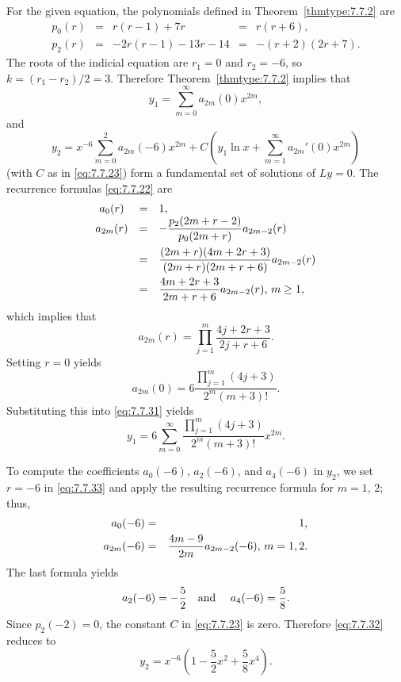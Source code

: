 \begin{examplesolution}
\solution For the given equation, the polynomials defined in Theorem~\ref{thmtype:7.7.2} are
\[
  \begin{array}{ccccc}
    p_{0}(r) & = & r(r-1)+7r       & = & r(r+6),       \\[5pt]
    p_{2}(r) & = & -2r(r-1)-13r-14 & = & -(r+2)(2r+7).
  \end{array}
\]
The roots of the indicial equation are $r_{1}=0$ and $r_{2}=-6$, so $k=(r_{1}-r_{2})/2=3$. Therefore
Theorem~\ref{thmtype:7.7.2} implies that
\begin{equation}
  \label{eq:7.7.31}y_{1}=\sum_{m=0}^{\infty}a_{2m}(0)x^{2m},
\end{equation}
and
\begin{equation}
  \label{eq:7.7.32}y_{2}=x^{-6}\sum_{m=0}^{2}a_{2m}(-6)x^{2m}+C\left(y_{1}\ln x+\sum_{m=1}^{\infty}a_{2m}'(0)x^{2m}\right)
\end{equation}
(with $C$ as in \eqref{eq:7.7.23}) form a fundamental set of solutions of $Ly=0$. The recurrence
formulas \eqref{eq:7.7.22} are
\begin{equation}
  \label{eq:7.7.33}
  \begin{array}{ccl}
    a_{0}(r)  & = & 1,                                                    \\
    a_{2m}(r) & = & -\displaystyle\frac{p_{2}(2m+r-2)}{p_{0}(2m+r)}a_{2m-2}(r)     \\[10pt]
              & = & \displaystyle\frac{(2m+r)(4m+2r+3)}{(2m+r)(2m+r+6)}a_{2m-2}(r) \\[10pt]
              & = & \displaystyle\frac{4m+2r+3}{2m+r+6}a_{2m-2}(r),\,m\ge1,
  \end{array}
\end{equation}
which implies that
\[
  a_{2m}(r)=\prod_{j=1}^{m}\frac{4j+2r+3}{2j+r+6}.
\]
Setting $r=0$ yields
\[
  a_{2m}(0)=6{\frac{\prod_{j=1}^{m}(4j+3)}{2^{m}(m+3)!}}.
\]
Substituting this into \eqref{eq:7.7.31} yields
\[
  y_{1}=6\sum_{m=0}^{\infty}\frac{\prod_{j=1}^{m}(4j+3)}{2^{m}(m+3)!}x^{2m}.
\]

To compute the coefficients $a_{0}(-6)$, $a_{2}(-6)$, and $a_{4}(-6)$ in $y_{2}$, we set $r=-6$ in
\eqref{eq:7.7.33} and apply the resulting recurrence formula for $m=1$, $2$; thus,
\begin{eqnarray*}
  a_{0}(-6)  & = & 1, \\
  a_{2m}(-6) & = & \displaystyle\frac{4m-9}{2m}a_{2m-2}(-6),\,m=1,2.
\end{eqnarray*}
The last formula yields
\[
  a_{2}(-6)=-\frac{5}{2}\text{\quad and \quad}a_{4}(-6)=\frac{5}{8}.
\]
Since $p_{2}(-2)=0$, the constant $C$ in \eqref{eq:7.7.23} is zero. Therefore \eqref{eq:7.7.32}
reduces to
\[
  y_{2}=x^{-6}\left(1-\frac{5}{2}x^{2}+\frac{5}{8}x^{4}\right).
\]
\end{examplesolution}

